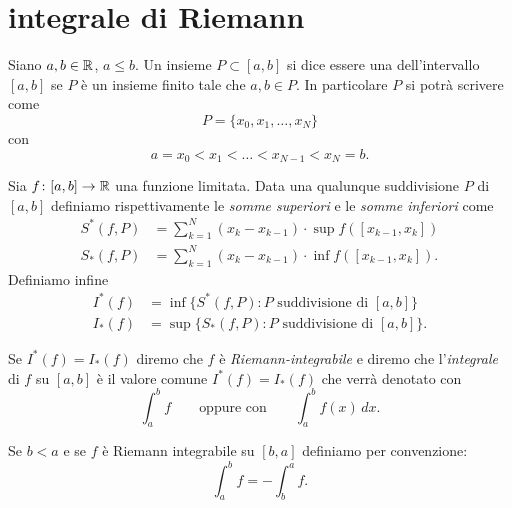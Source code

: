 \section{integrale di Riemann}

\begin{definition}
\mymark{***}
Siano $a,b\in \mathbb R$, $a \le b$.
Un insieme $P\subset [a,b]$ si dice essere una 
dell'intervallo $[a,b]$ se $P$ è un insieme finito tale che $a,b\in P$.
In particolare $P$ si
potrà scrivere come
\[
 P = \{ x_0, x_1, \dots, x_N\}
\]
con
\[
  a = x_0 < x_1 < \dots < x_{N-1} < x_N = b.
\]

Sia $f\colon [a,b] \to \mathbb R$ una funzione limitata.
Data una qualunque suddivisione $P$ di $[a,b]$ definiamo
rispettivamente le \emph{somme superiori} e le \emph{somme inferiori}
come
\begin{align*}
S^*(f,P)
&= \sum_{k=1}^N (x_k - x_{k-1}) \cdot \sup f([x_{k-1},x_k]) \\
S_*(f,P)
&= \sum_{k=1}^N (x_k - x_{k-1}) \cdot \inf f([x_{k-1},x_k]).
\end{align*}
Definiamo infine
\begin{align*}
  I^*(f) &= \inf \{S^*(f,P) \colon \text{$P$ suddivisione di $[a,b]$}\}
  \\
  I_*(f) &= \sup \{S_*(f,P) \colon \text{$P$ suddivisione di $[a,b]$}\}.
\end{align*}

Se $I^*(f) = I_*(f)$ diremo che $f$ è
\emph{Riemann-integrabile}
%
%
%
%
%
e diremo che l'\emph{integrale} di $f$ su $[a,b]$ è
il valore comune $I^*(f)=I_*(f)$ che verrà denotato con
\[
  \int_a^b f
  \qquad{\text{oppure con}} \qquad
  \int_a^b f(x)\, dx.
\]

Se $b<a$ e se $f$ è Riemann integrabile su $[b,a]$
definiamo per convenzione:
\[
  \int_a^b f = -\int_b^a f.
\]
\end{definition}

